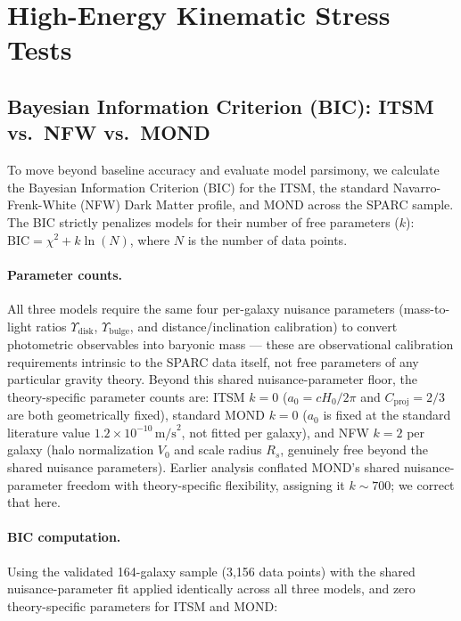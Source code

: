 \documentclass[aps,prd,10pt,twocolumn,superscriptaddress,nofootinbib,floatfix]{revtex4-2}
\begin{document}
\section{High-Energy Kinematic Stress Tests}

\subsection{\label{sec:bic}Bayesian Information Criterion (BIC): ITSM vs.\ NFW vs.\ MOND}
To move beyond baseline accuracy and evaluate model parsimony, we calculate the Bayesian Information Criterion (BIC) for the ITSM, the standard Navarro-Frenk-White (NFW) Dark Matter profile, and MOND across the SPARC sample. The BIC strictly penalizes models for their number of free parameters ($k$): $\text{BIC} = \chi^2 + k \ln(N)$, where $N$ is the number of data points.

\paragraph{Parameter counts.} All three models require the same four per-galaxy nuisance parameters (mass-to-light ratios $\Upsilon_{\text{disk}}$, $\Upsilon_{\text{bulge}}$, and distance/inclination calibration) to convert photometric observables into baryonic mass --- these are observational calibration requirements intrinsic to the SPARC data itself, not free parameters of any particular gravity theory. Beyond this shared nuisance-parameter floor, the theory-specific parameter counts are: ITSM $k=0$ ($a_0=cH_0/2\pi$ and $C_{\text{proj}}=2/3$ are both geometrically fixed), standard MOND $k=0$ ($a_0$ is fixed at the standard literature value $1.2\times10^{-10}\,\text{m/s}^2$, not fitted per galaxy), and NFW $k=2$ per galaxy (halo normalization $V_0$ and scale radius $R_s$, genuinely free beyond the shared nuisance parameters). Earlier analysis conflated MOND's shared nuisance-parameter freedom with theory-specific flexibility, assigning it $k\sim700$; we correct that here.

\paragraph{BIC computation.} Using the validated 164-galaxy sample (3,156 data points) with the shared nuisance-parameter fit applied identically across all three models, and zero theory-specific parameters for ITSM and MOND:
\end{document}
